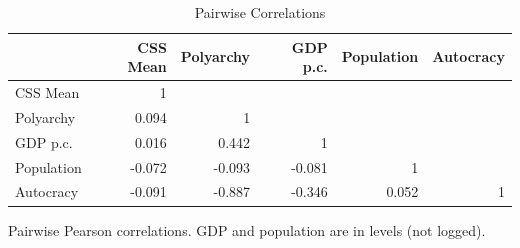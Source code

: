 \begin{table}[htbp]
\caption{\label{tab:corr_matrix} Pairwise Correlations}
\bigskip
\centering
\begin{tabular}{lrrrrr}
\toprule
 & CSS Mean & Polyarchy & GDP p.c. & Population & Autocracy \\
\midrule
CSS Mean & 1 &  &  &  &  \\
Polyarchy & 0.094 & 1 &  &  &  \\
GDP p.c. & 0.016 & 0.442 & 1 &  &  \\
Population & -0.072 & -0.093 & -0.081 & 1 &  \\
Autocracy & -0.091 & -0.887 & -0.346 & 0.052 & 1 \\
\bottomrule
\end{tabular}
\par \raggedright
Pairwise Pearson correlations. GDP and population are in levels (not logged).
\end{table}
